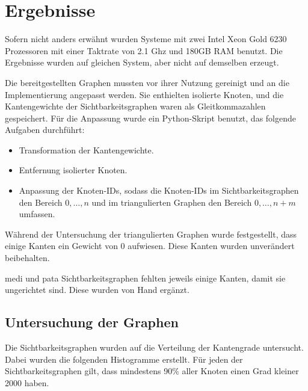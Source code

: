 \chapter{Ergebnisse}

Sofern nicht anders erwähnt wurden Systeme mit zwei Intel Xeon Gold 6230 Prozessoren mit einer Taktrate von 2.1 Ghz und 180GB RAM benutzt.
Die Ergebnisse wurden auf gleichen System, aber nicht auf demselben erzeugt.

Die bereitgestellten Graphen mussten vor ihrer Nutzung gereinigt und an die Implementierung angepasst werden.
Sie enthielten isolierte Knoten, und die Kantengewichte der Sichtbarkeitsgraphen waren als Gleitkommazahlen gespeichert.
Für die Anpassung wurde ein Python-Skript benutzt, das folgende Aufgaben durchführt:

\begin{itemize}
    \item
          Transformation der Kantengewichte.

    \item
          Entfernung isolierter Knoten.

    \item
          Anpassung der Knoten-IDs, sodass die Knoten-IDs im Sichtbarkeitsgraphen den Bereich $0, \dotsc, n$ und im triangulierten Graphen den Bereich $0, \dotsc, n + m$ umfassen.
\end{itemize}

Während der Untersuchung der triangulierten Graphen wurde festgestellt, dass einige Kanten ein Gewicht von 0 aufwiesen.
Diese Kanten wurden unverändert beibehalten.

medi und pata Sichtbarkeitsgraphen fehlten jeweils einige Kanten, damit sie ungerichtet sind.
Diese wurden von Hand ergänzt.

\section{Untersuchung der Graphen}

Die Sichtbarkeitsgraphen wurden auf die Verteilung der Kantengrade untersucht.
Dabei wurden die folgenden Histogramme erstellt.
Für jeden der Sichtbarkeitsgraphen gilt, dass mindestens 90\% aller Knoten einen Grad kleiner \num{2000} haben.

